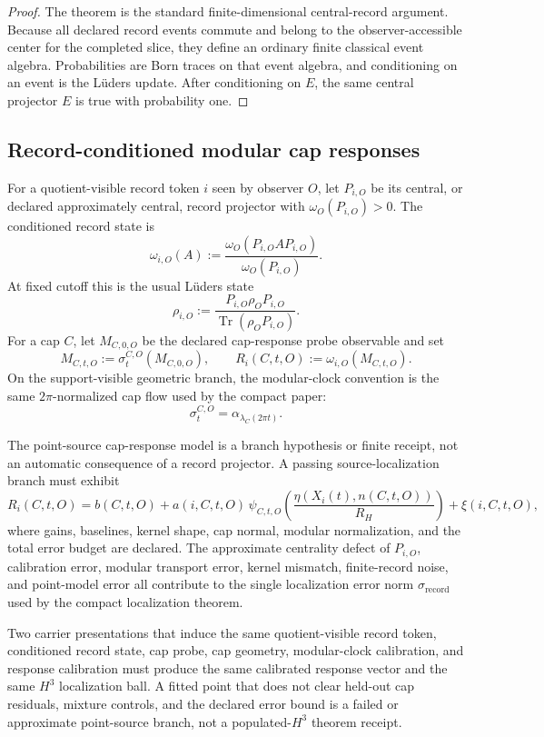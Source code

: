 \documentclass[11pt]{article}
\theoremstyle{remark}
\theoremstyle{plain}
\begin{document}
\begin{proof}
The theorem is the standard finite-dimensional central-record argument. Because all declared
record events commute and belong to the observer-accessible center for the completed slice, they
define an ordinary finite classical event algebra. Probabilities are Born traces on that event
algebra, and conditioning on an event is the L\"uders update. After conditioning on \(E\), the
same central projector \(E\) is true with probability one.
\end{proof}

\subsection{Record-conditioned modular cap responses}\label{subsec:record-conditioned-modular-cap-responses}

For a quotient-visible record token \(i\) seen by observer \(O\), let \(P_{i,O}\) be its central,
or declared approximately central, record projector with \(\omega_O(P_{i,O})>0\). The conditioned
record state is
\[
\omega_{i,O}(A):=
\frac{\omega_O(P_{i,O}AP_{i,O})}{\omega_O(P_{i,O})}.
\]
At fixed cutoff this is the usual L\"uders state
\[
\rho_{i,O}:=\frac{P_{i,O}\rho_OP_{i,O}}{\operatorname{Tr}(\rho_OP_{i,O})}.
\]
For a cap \(C\), let \(M_{C,0,O}\) be the declared cap-response probe observable and set
\[
M_{C,t,O}:=\sigma_t^{C,O}(M_{C,0,O}),\qquad
R_i(C,t,O):=\omega_{i,O}(M_{C,t,O}).
\]
On the support-visible geometric branch, the modular-clock convention is the same
\(2\pi\)-normalized cap flow used by the compact paper:
\[
\sigma_t^{C,O}=\alpha_{\lambda_C(2\pi t)}.
\]

The point-source cap-response model is a branch hypothesis or finite receipt, not an automatic
consequence of a record projector. A passing source-localization branch must exhibit
\[
R_i(C,t,O)
=
b(C,t,O)
+a(i,C,t,O)\,
\psi_{C,t,O}\!\left(\frac{\eta(X_i(t),n(C,t,O))}{R_H}\right)
+\xi(i,C,t,O),
\]
where gains, baselines, kernel shape, cap normal, modular normalization, and the total error budget
are declared. The approximate centrality defect of \(P_{i,O}\), calibration error, modular
transport error, kernel mismatch, finite-record noise, and point-model error all contribute to the
single localization error norm \(\sigma_{\mathrm{record}}\) used by the compact localization
theorem.

Two carrier presentations that induce the same quotient-visible record token, conditioned record
state, cap probe, cap geometry, modular-clock calibration, and response calibration must produce
the same calibrated response vector and the same \(H^3\) localization ball. A fitted point that
does not clear held-out cap residuals, mixture controls, and the declared error bound is a failed
or approximate point-source branch, not a populated-\(H^3\) theorem receipt.
\end{document}
